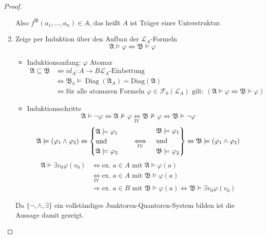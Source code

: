 \documentclass[12pt,parskip=full]{scrartcl}
\theoremstyle{definition}
\begin{document}
\begin{proof}
\begin{enumerate}
			Also $f^\mathfrak{B}(a_1, \dots, a_n) \in A$, das heißt $A$ ist Träger einer Unterstruktur.
			\item Zeige per Induktion über den Aufbau der $\mathcal{L}_A$-Formeln
			\begin{equation*}
				\mathfrak{A} \models \varphi \Leftrightarrow \mathfrak{B} \models \varphi
			\end{equation*}
			\begin{itemize}
				\item Induktionsanfang: $\varphi$ Atomar
				\begin{align*}
					\mathfrak{A} \subseteq \mathfrak{B} &\Leftrightarrow id_A: A \to B \text{$\mathcal{L}_A$-Einbettung} \\
					&\Leftrightarrow \mathfrak{B}_h \models \operatorname{Diag}(\mathfrak{A}_A) = \operatorname{Diag(\mathfrak{A})} \\
					&\Leftrightarrow \text{für alle atomaren Formeln $\varphi \in \mathcal{F}_0(\mathcal{L}_A)$ gilt: } (\mathfrak{A} \models \varphi \Leftrightarrow \mathfrak{B} \models \varphi)
				\end{align*}
				\item Induktionsschritte
				\begin{equation*}
					\mathfrak{A} \models \lnot \varphi \Leftrightarrow \mathfrak{A} \not\models \varphi \underset{\text{IV}}{\Leftrightarrow} \mathfrak{B} \not\models \varphi \Leftrightarrow \mathfrak{B} \models \lnot \varphi
				\end{equation*}
				\begin{equation*}
					\mathfrak{A} \models (\varphi_1 \land \varphi_2) \Leftrightarrow \begin{cases}
						\mathfrak{A} \models \varphi_1 \\
						\text{und} \\
						\mathfrak{A} \models \varphi_2
					\end{cases} \quad\underset{\text{IV}}{\Longleftrightarrow}\quad \begin{drcases}
						\mathfrak{B} \models \varphi_1 \\
						\text{und} \\
						\mathfrak{B} \models \varphi_2
					\end{drcases} \Leftrightarrow \mathfrak{B} \models (\varphi_1 \land \varphi_2)
				\end{equation*}
				\begin{align*}
					\mathfrak{A} \models \exists v_0 \varphi(v_0) &\Leftrightarrow \text{ex. $a \in A$ mit } \mathfrak{A} \models \varphi(a) \\
					&\underset{\text{IV}}{\Leftrightarrow} \text{ex. $a \in A$ mit } \mathfrak{B} \models \varphi(a) \\&\Rightarrow \text{ex. $a \in B$ mit } \mathfrak{B} \models \varphi(a) \Leftrightarrow \mathfrak{B} \models \exists v_0 \varphi(v_0)
				\end{align*}
			\end{itemize}
			Da $\{ \lnot, \land, \exists \}$ ein vollständiges Junktoren-Quantoren-System bilden ist die Aussage damit gezeigt.
		\end{enumerate}
	\end{proof}
\end{document}

